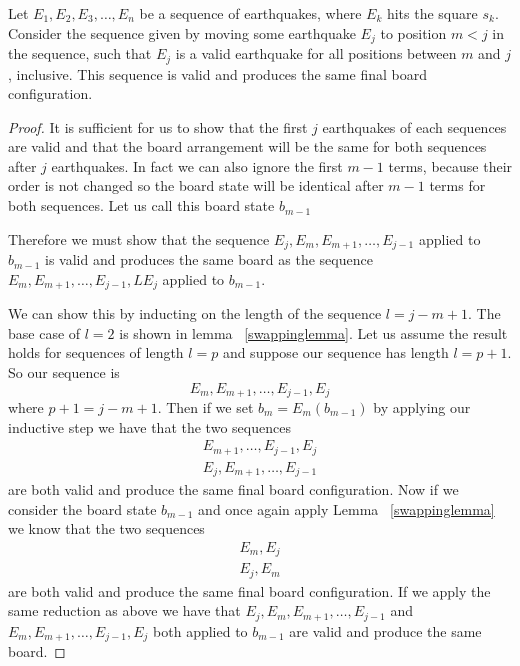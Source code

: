 \documentclass[runningheads,a4paper]{llncs}
\begin{document}
\begin{lemma}
Let $E_1,E_2,E_3,\dots, E_n$ be a sequence of earthquakes, where $E_k$ hits the square $s_k$. Consider  the sequence given by moving some earthquake $E_j$ to position $m<j$ in the sequence, such that $E_j$ is a valid earthquake for all positions between $m$ and $j$, inclusive. 
This sequence is valid and produces the same final board configuration.
\end{lemma}
\label{shiftlemma}
\begin{proof}
It is sufficient for us to show that the first $j$ earthquakes of each sequences are valid and that the board arrangement will be the same for both sequences after $j$ earthquakes. In fact we can also ignore the first $m-1$ terms, because their order is not changed so the board state will be identical after $m-1$ terms for both sequences. Let us call this board state $b_{m-1}$

Therefore we must show that the sequence $E_j, E_m, E_{m+1}, \ldots, E_{j-1}$ applied to $b_{m-1}$ is valid and produces the same board as the sequence $E_m, E_{m+1}, \ldots, E_{j-1}, LE_j$ applied to $b_{m-1}$. 

We can show this by inducting on the length of the sequence $l=j-m+1$. The base case of $l=2$ is shown in lemma ~\ref{swappinglemma}. Let us assume the result holds for sequences of length $l=p$ and suppose our sequence has length $l=p+1$. So our sequence is 
\begin{equation*}
E_m, E_{m+1}, \ldots, E_{j-1}, E_j
\end{equation*}
where $p+1=j-m+1$. Then if we set $b_{m} = E_{m} (b_{m-1})$ by applying our inductive step we have that the two sequences 
\begin{align*}
E_{m+1}, \ldots, E_{j-1}, E_{j} \\ 
E_{j}, E_{m+1}, \ldots,  E_{j-1} 
\end{align*}
are both valid and produce the same final board configuration. Now if we consider the board state $b_{m-1}$ and once again apply Lemma ~\ref{swappinglemma} we know that the two sequences 
\begin{align*}
E_{m}, E_{j} \\
E_{j}, E_{m}
\end{align*}
are both valid and produce the same final board configuration. If we apply the same reduction as above  we have  that $E_j, E_m, E_{m+1}, \ldots, E_{j-1}$  and $E_m, E_{m+1}, \ldots, E_{j-1}, E_j$ both applied to $b_{m-1}$ are valid and produce the same board. 
\end{proof}
\end{document}
